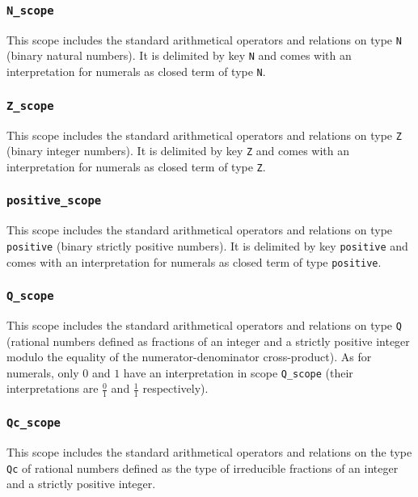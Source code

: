 \subsubsection{\tt N\_scope}

This scope includes the standard arithmetical operators and relations on
type {\tt N} (binary natural numbers). It is delimited by key {\tt N}
and comes with an interpretation for numerals as closed term of type {\tt N}.

\subsubsection{\tt Z\_scope}

This scope includes the standard arithmetical operators and relations on
type {\tt Z} (binary integer numbers). It is delimited by key {\tt Z} 
and comes with an interpretation for numerals as closed term of type {\tt Z}.

\subsubsection{\tt positive\_scope}

This scope includes the standard arithmetical operators and relations on
type {\tt positive} (binary strictly positive numbers). It is
delimited by key {\tt positive} and comes with an interpretation for
numerals as closed term of type {\tt positive}.

\subsubsection{\tt Q\_scope}

This scope includes the standard arithmetical operators and relations on
type {\tt Q} (rational numbers defined as fractions of an integer and
a strictly positive integer modulo the equality of the
numerator-denominator cross-product). As for numerals, only $0$ and
$1$ have an interpretation in scope {\tt Q\_scope} (their
interpretations are $\frac{0}{1}$ and $\frac{1}{1}$ respectively).

\subsubsection{\tt Qc\_scope}

This scope includes the standard arithmetical operators and relations on the
type {\tt Qc} of rational numbers defined as the type of irreducible
fractions of an integer and a strictly positive integer.

